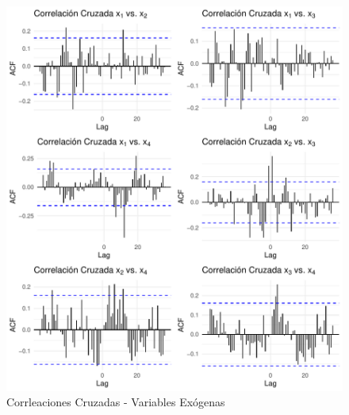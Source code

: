 \documentclass[12pt,oneside]{book}\usepackage[]{graphicx}\usepackage[]{color}
\makeatletter
\def\maxwidth{ %
  \ifdim\Gin@nat@width>\linewidth
    \linewidth
  \else
    \Gin@nat@width
  \fi
}
\newenvironment{knitrout}{}{} %
\theoremstyle{definition} %
\makeatother
\begin{document}






\begin{knitrout}
\color{fgcolor}\begin{figure}[H]

{\centering \includegraphics[width=\maxwidth]{figure/unnamed-chunk-34-1} 

}

\caption{\label{fig:cc_exogenas} Corrleaciones Cruzadas - Variables Exógenas}\label{fig:unnamed-chunk-34}
\end{figure}


\end{knitrout}
\end{document}
